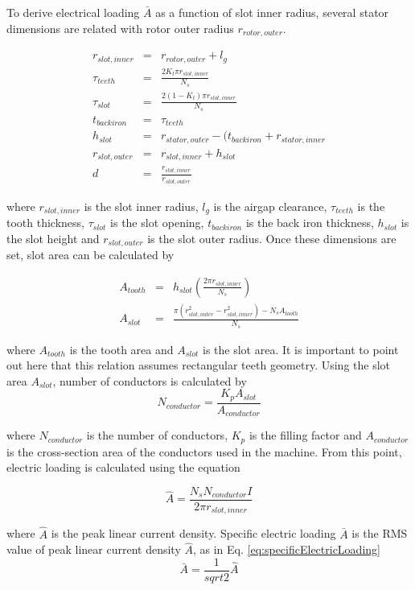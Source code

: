 \documentclass[a4paper, 11pt, titlepage]{article}
\begin{document}
To derive electrical loading $\bar{A}$ as a function of slot inner radius, several stator dimensions are related with rotor outer radius $r_{rotor,outer}$.

\begin{eqnarray}
	r_{slot, inner} &=& r_{rotor,outer} + l_g \\
	\tau_{teeth} &=& \frac{2K_t\pi r_{slot,inner}}{N_s} \\
	\tau_{slot} &=& \frac{2(1-K_t)\pi r_{slot,inner}}{N_s} \\
	t_{back iron} &=& \tau_{teeth} \\
	h_{slot} &=& r_{stator,outer}-(t_{back iron}+r_{stator,inner} \\
	r_{slot,outer} &=& r_{slot,inner}+h_{slot} \\
	d &=& \frac{r_{slot,inner}}{r_{slot,outer}}
	\label{eq:machineDimensions}
\end{eqnarray}

where $r_{slot, inner}$ is the slot inner radius, $l_g$ is the airgap clearance, $\tau_{teeth}$ is the tooth thickness, $\tau_{slot}$ is the slot opening, $t_{back iron}$ is the back iron thickness, $h_{slot}$ is the slot height and $r_{slot,outer}$ is the slot outer radius. Once these dimensions are set, slot area can be calculated by

\begin{eqnarray}
	A_{tooth} &=& h_{slot}(\frac{2\pi r_{slot,inner}}{N_s}) \\
	A_{slot} &=& \frac{\pi(r^2_{slot,outer}-r^2_{slot,inner})-N_sA_{tooth}}{N_s}
\end{eqnarray}

where $A_{tooth}$ is the tooth area and $A_{slot}$ is the slot area. It is important to point out here that this relation assumes rectangular teeth geometry.
Using the slot area $A_{slot}$, number of conductors is calculated by
\begin{equation}
	N_{conductor} = \frac{K_pA_{slot}}{A_{conductor}}
\end{equation}

where  $N_{conductor}$ is the number of conductors, $K_p$ is the filling factor and $A_{conductor}$ is the cross-section area of the conductors used in the machine. From this point, electric loading is calculated using the equation

\begin{equation}
	\hat{A}=\frac{N_sN_{conductor}I}{2\pi r_{slot,inner}}
	\label{eq:peakLinearCurrentDensity}
\end{equation}

where $\hat{A}$ is the peak linear current density. Specific electric loading $\bar{A}$ is the RMS value of peak linear current density $\hat{A}$, as in Eq. \ref{eq:specificElectricLoading}
\begin{equation}
	\bar{A}=\frac{1}{sqrt{2}}\hat{A}
	\label{eq:specificElectricLoading}
\end{equation}

\newpage

 

\end{document}

